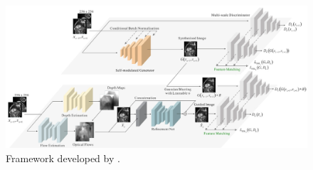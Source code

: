 \begin{figure}[!ht]
	\hspace*{-0.35in}
	\includegraphics[width=1.1\linewidth]{figures/XiaFramework.png}
	\caption{Framework developed by \textcite{Xia2021}.}
	\label{fig:XiaFramework}
\end{figure}

